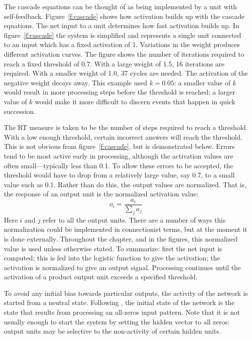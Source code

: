 The cascade equations can be thought of as being implemented by a unit with
self-feedback. Figure~\ref{f:cascade} shows how activation builds up with
the cascade
equations.  The net input to a unit determines how fast activation builds
up.  In figure~\ref{f:cascade} the system is simplified and represents a
single unit connected to an input which has a fixed activation of 1.
Variations in the weight produces different activation curves.  The figure
shows the number of iterations required to reach a fixed threshold of 0.7.
 With a large weight of 1.5, 16 iterations are required.
With a smaller weight of 1.0, 37 cycles are needed.  The
activation of the negative
weight decays away.  This example used $k=0.05$:  a smaller value of $k$
would result in more processing steps before the threshold is reached; a
larger value of $k$ would make it more
difficult to discern events that happen in quick succession.

The RT measure is taken to be the number of steps required to reach a
threshold. With a low enough threshold, certain incorrect answers will
reach the threshold. This is not obvious from figure~\ref{f:cascade}, but
is demonstrated below.  Errors tend to be most active early in processing,
although the activation values are often small---typically less than 0.1.
To allow these errors to be accepted, the threshold would have to drop from
a relatively large value, say 0.7, to a small value such as 0.1. Rather
than do this, the output values are normalized. That is, the response of an
output unit is the normalized activation value:
$$ o_i = \frac{a_i}{\sum\limits_j a_j} $$
Here $i$ and $j$ refer to all the output units.
There are a number of ways this normalization could
be implemented in connectionist
terms, but at the moment it is done externally.
Throughout the chapter, and in the figures, this normalized
value is used unless otherwise stated.  To summarize: first the net input
is computed; this is fed into the logistic function to give the activation;
the activation is normalized to give an output signal.  Processing
continues until the activation of a product output unit exceeds a specified
threshold.

To avoid any initial bias towards particular outputs, the activity of the
network is started from a neutral state.  Following , the
initial state of the network is the state that results from processing an
all-zeros input pattern.  Note that it is not usually enough to start the
system by setting the hidden vector to all zeros: output units may be
selective to the non-activity of certain hidden units.

